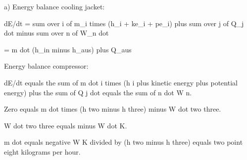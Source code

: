 a) Energy balance cooling jacket:

dE/dt = sum over i of m_i times (h_i + ke_i + pe_i) plus sum over j of Q_j dot minus sum over n of W_n dot

= m dot (h_in minus h_aus) plus Q_aus

Energy balance compressor:

dE/dt equals the sum of m dot i times (h i plus kinetic energy plus potential energy) plus the sum of Q j dot equals the sum of n dot W n.

Zero equals m dot times (h two minus h three) minus W dot two three.

W dot two three equals minus W dot K.

m dot equals negative W K divided by (h two minus h three) equals two point eight kilograms per hour.